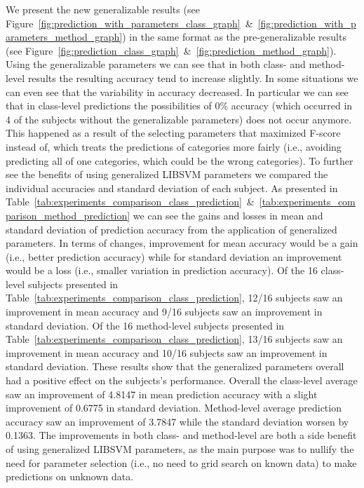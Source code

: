 We present the new generalizable results (see Figure~\ref{fig:prediction_with_parameters_class_graph}~\&~\ref{fig:prediction_with_parameters_method_graph}) in the same format as the pre-generalizable results (see Figure~\ref{fig:prediction_class_graph}~\&~\ref{fig:prediction_method_graph}). Using the generalizable parameters we can see that in both class- and method-level results the resulting accuracy tend to increase slightly. In some situations we can even see that the variability in accuracy decreased. In particular we can see that in class-level predictions the possibilities of 0\% accuracy (which occurred in 4 of the subjects without the generalizable parameters) does not occur anymore. This happened as a result of the selecting parameters that maximized F-score instead of, which treats the predictions of categories more fairly (i.e., avoiding predicting all of one categories, which could be the wrong categories). To further see the benefits of using generalized LIBSVM parameters we compared the individual accuracies and standard deviation of each subject. As presented in Table~\ref{tab:experiments_comparison_class_prediction}~\&~\ref{tab:experiments_comparison_method_prediction} we can see the gains and losses in mean and standard deviation of prediction accuracy from the application of generalized parameters. In terms of changes, improvement for mean accuracy would be a gain (i.e., better prediction accuracy) while for standard deviation an improvement would be a loss (i.e., smaller variation in prediction accuracy). Of the 16 class-level subjects presented in Table~\ref{tab:experiments_comparison_class_prediction}, 12/16 subjects saw an improvement in mean accuracy and 9/16 subjects saw an improvement in standard deviation. Of the 16 method-level subjects presented in Table~\ref{tab:experiments_comparison_class_prediction}, 13/16 subjects saw an improvement in mean accuracy and 10/16 subjects saw an improvement in standard deviation. These results show that the generalized parameters overall had a positive effect on the subjects's performance. Overall the class-level average saw an improvement of 4.8147 in mean prediction accuracy with a slight improvement of 0.6775 in standard deviation. Method-level average prediction accuracy saw an improvement of 3.7847 while the standard deviation worsen by 0.1363. The improvements in both class- and method-level are both a side benefit of using generalized LIBSVM parameters, as the main purpose was to nullify the need for parameter selection (i.e., no need to grid search on known data) to make predictions on unknown data.

